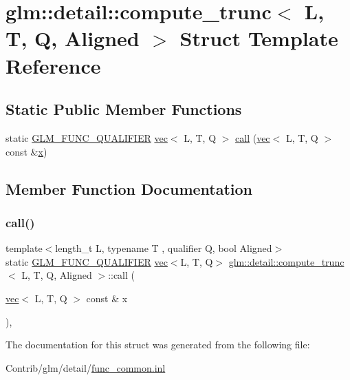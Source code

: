 \hypertarget{structglm_1_1detail_1_1compute__trunc}{}\section{glm\+:\+:detail\+:\+:compute\+\_\+trunc$<$ L, T, Q, Aligned $>$ Struct Template Reference}
\label{structglm_1_1detail_1_1compute__trunc}
\subsection*{Static Public Member Functions}
\begin{DoxyCompactItemize}
\item 
static \mbox{\hyperlink{setup_8hpp_a33fdea6f91c5f834105f7415e2a64407}{G\+L\+M\+\_\+\+F\+U\+N\+C\+\_\+\+Q\+U\+A\+L\+I\+F\+I\+ER}} \mbox{\hyperlink{structglm_1_1vec}{vec}}$<$ L, T, Q $>$ \mbox{\hyperlink{structglm_1_1detail_1_1compute__trunc_a6e3185641ef24c593f34dc6c11f46ca6}{call}} (\mbox{\hyperlink{structglm_1_1vec}{vec}}$<$ L, T, Q $>$ const \&\mbox{\hyperlink{_s_d_l__opengl_8h_ad0e63d0edcdbd3d79554076bf309fd47}{x}})
\end{DoxyCompactItemize}


\subsection{Member Function Documentation}
\mbox{\label{structglm_1_1detail_1_1compute__trunc_a6e3185641ef24c593f34dc6c11f46ca6}} 
\subsubsection{\texorpdfstring{call()}{call()}}
{\footnotesize\ttfamily template$<$length\+\_\+t L, typename T , qualifier Q, bool Aligned$>$ \\
static \mbox{\hyperlink{setup_8hpp_a33fdea6f91c5f834105f7415e2a64407}{G\+L\+M\+\_\+\+F\+U\+N\+C\+\_\+\+Q\+U\+A\+L\+I\+F\+I\+ER}} \mbox{\hyperlink{structglm_1_1vec}{vec}}$<$L, T, Q$>$ \mbox{\hyperlink{structglm_1_1detail_1_1compute__trunc}{glm\+::detail\+::compute\+\_\+trunc}}$<$ L, T, Q, Aligned $>$\+::call (\begin{DoxyParamCaption}\item[{\mbox{\hyperlink{structglm_1_1vec}{vec}}$<$ L, T, Q $>$ const \&}]{x }\end{DoxyParamCaption})\hspace{0.3cm}{\ttfamily [inline]}, {\ttfamily [static]}}



The documentation for this struct was generated from the following file\+:\begin{DoxyCompactItemize}
\item 
Contrib/glm/detail/\mbox{\hyperlink{func__common_8inl}{func\+\_\+common.\+inl}}\end{DoxyCompactItemize}
